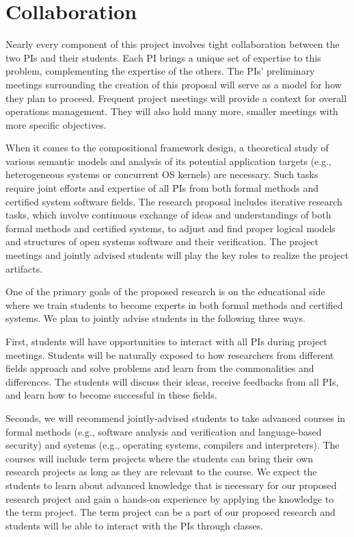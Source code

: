\documentclass[11pt]{article}
\begin{document}
\section{Collaboration}

Nearly every component of this project involves tight collaboration
between the two PIs and their students. Each PI brings a unique set of
expertise to this problem, complementing the expertise of the
others. The PIs' preliminary meetings surrounding the creation of this
proposal will serve as a model for how they plan to proceed. Frequent
project meetings will provide a context for overall operations
management. They will also hold many more, smaller meetings with more
specific objectives.

When it comes to the compositional framework design, a theoretical
study of various semantic models and analysis of its potential
application targets (e.g., heterogeneous systems or concurrent OS
kernels) are necessary. Such tasks require joint efforts and expertise
of all PIs from both formal methods and certified system software
fields. The research proposal includes iterative research tasks, which
involve continuous exchange of ideas and understandings of both formal
methods and certified systems, to adjust and find proper logical
models and structures of open systems software and their
verification. The project meetings and jointly advised students will
play the key roles to realize the project artifacts.

One of the primary goals of the proposed research is on the
educational side where we train students to become experts in both
formal methods and certified systems. We plan
to jointly advise students in the following three ways.

First, students will have opportunities to interact with all PIs during
project meetings. Students will be naturally exposed to how 
researchers from different fields approach and 
solve problems and learn from the commonalities and differences. The students
will discuss their ideas, receive feedbacks from all PIs, and learn how to 
become successful in these fields. 

Seconds, we will recommend jointly-advised students to take advanced
courses in formal methods (e.g., software analysis and verification
and language-based security) and systems (e.g., operating systems,
compilers and interpreters). The
courses will include term projects where the students can bring their
own research projects as long as they are relevant to the course.  We
expect the students to learn about advanced knowledge that is
necessary for our proposed research project and gain a hands-on
experience by applying the knowledge to the term project. The term
project can be a part of our proposed research and students will be
able to interact with the PIs through classes.
\end{document}

